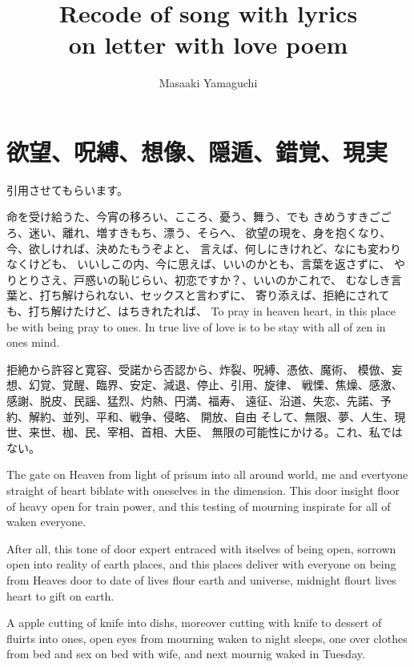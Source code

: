 \documentclass{jsarticle}
\begin{document}
\title{Recode of song with lyrics \\
on letter with love poem}
\author{Masaaki Yamaguchi}
\date{}
\maketitle

\section{欲望、呪縛、想像、隠遁、錯覚、現実}


                引用させてもらいます。


               命を受け給うた、今宵の移ろい、こころ、憂う、舞う、でも
	 きめうすきごごろ、迷い、離れ、増すきもち、漂う、そらへ、
	 欲望の現を、身を抱くなり、今、欲しければ、決めたもうぞよと、
	 言えば、何しにきけれど、なにも変わりなくけども、
	 いいしこの内、今に思えば、いいのかとも、言葉を返さずに、
	 やりとりさえ、戸惑いの恥じらい、初恋ですか？、いいのかこれで、
	 むなしき言葉と、打ち解けられない、セックスと言わずに、
	 寄り添えば、拒絶にされても、打ち解けたけど、はちきれたれば、
         To pray in heaven heart, in this place be with being pray to ones.
	 In true live of love is to be stay with all of zen in ones mind.
	 

	 拒絶から許容と寛容、受諾から否認から、炸裂、呪縛、憑依、魔術、
	 模倣、妄想、幻覚、覚醒、臨界、安定、減退、停止、引用、旋律、
	 戦慄、焦燥、感激、感謝、脱皮、民謡、猛烈、灼熱、円満、福寿、
	 遠征、沿道、失恋、先諾、予約、解約、並列、平和、戦争、侵略、
	 開放、自由
	 そして、無限、夢、人生、現世、来世、枷、民、宰相、首相、大臣、
	 無限の可能性にかける。これ、私ではない。

	       The gate on Heaven from light of prisum into all around world,
	 me and evertyone straight of heart biblate with oneselves in
	 the dimension. This door insight floor of heavy open for train
	 power, and this testing of mourning inspirate for all of waken
	 everyone. 


	       After all, this tone of door expert entraced with
	 itselves of being open, sorrown open into reality of earth places,
	 and this places deliver with everyone on being from Heaves door 
	 to date of lives flour earth and universe, midnight flourt
	 lives heart to gift on earth.


	     A apple cutting of knife into dishs, moreover cutting with knife
	 to dessert of fluirts into ones, open eyes from mourning waken
	 to night sleeps, one over clothes from bed and sex on bed with
	 wife, and next mournig waked in Tuesday.
\end{document}
